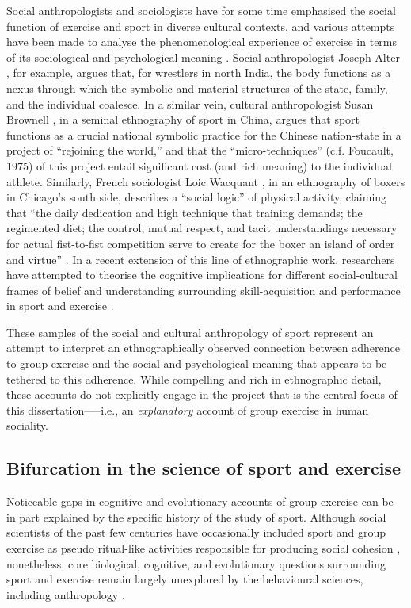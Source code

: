 Social anthropologists and sociologists have for some time emphasised the social function of exercise and sport in diverse cultural contexts, and various attempts have been made to analyse the phenomenological experience of exercise in terms of its sociological and psychological meaning \citep{Bourdieu1978}.  Social anthropologist Joseph Alter \textcite{Alter1993}, for example, argues that, for wrestlers in north India, the body functions as a nexus through which the symbolic and material structures of the state, family, and the individual coalesce.  In a similar vein, cultural anthropologist Susan Brownell \textcite{Bronwell1995}, in a seminal ethnography of sport in China, argues that sport functions as a crucial national symbolic practice for the Chinese nation-state in a project of ``rejoining the world,'' and that the ``micro-techniques'' (c.f. Foucault, 1975) of this project entail significant cost (and rich meaning) to the individual athlete.   Similarly, French sociologist Loic Wacquant \textcite{Wacquant2004}, in an ethnography of boxers in Chicago’s south side, describes a ``social logic'' of physical activity, claiming that ``the daily dedication and high technique that training demands; the regimented diet; the control, mutual respect, and tacit understandings necessary for actual fist-to-fist competition serve to create for the boxer an island of order and virtue'' \textcite[17]{Wacquant2004}.  In a recent extension of this line of ethnographic work, researchers have attempted to theorise the cognitive implications for different social-cultural frames of belief and understanding surrounding skill-acquisition and performance in sport and exercise \citep{Downey2005bDowney2007,Marchand2010}.

These samples of the social and cultural anthropology of sport represent an attempt to interpret an ethnographically observed connection between adherence to group exercise and the social and psychological meaning that appears to be tethered to this adherence.  While compelling and rich in ethnographic detail, these accounts do not explicitly engage in the project that is the central focus of this dissertation—--i.e., an \textit{explanatory} account of group exercise in human sociality.


\subsection{Bifurcation in the science of sport and exercise}

Noticeable gaps in cognitive and evolutionary accounts of group exercise can be in part explained by the specific history of the study of sport.  Although social scientists of the past few centuries have occasionally included sport and group exercise as pseudo ritual-like activities responsible for producing social cohesion \citep{Durkheim1965,Mauss1935,Turner1977}, nonetheless, core biological, cognitive, and evolutionary questions surrounding sport and exercise remain largely unexplored by the behavioural sciences, including anthropology \citep{Blanchard1995,Downey2005a}.

